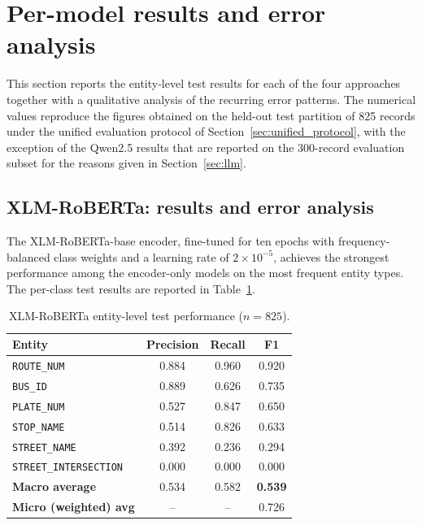 \section{Per-model results and error analysis}
\label{sec:per_model}

This section reports the entity-level test results for each of the four approaches together with a qualitative analysis of the recurring error patterns. The numerical values reproduce the figures obtained on the held-out test partition of 825 records under the unified evaluation protocol of Section~\ref{sec:unified_protocol}, with the exception of the Qwen2.5 results that are reported on the 300-record evaluation subset for the reasons given in Section~\ref{sec:llm}.

\subsection{XLM-RoBERTa: results and error analysis}
\label{sec:xlmr_results}

The XLM-RoBERTa-base encoder, fine-tuned for ten epochs with frequency-balanced class weights and a learning rate of $2{\times}10^{-5}$, achieves the strongest performance among the encoder-only models on the most frequent entity types. The per-class test results are reported in Table~\ref{tab:xlmr}.

\begin{table}[H]
\centering
\caption{XLM-RoBERTa entity-level test performance ($n=825$).}
\label{tab:xlmr}
\renewcommand{\arraystretch}{1.3}
\begin{tabular}{lccc}
\toprule
\textbf{Entity} & \textbf{Precision} & \textbf{Recall} & \textbf{F1} \\
\midrule
\texttt{ROUTE\_NUM}           & 0.884 & 0.960 & 0.920 \\
\texttt{BUS\_ID}              & 0.889 & 0.626 & 0.735 \\
\texttt{PLATE\_NUM}           & 0.527 & 0.847 & 0.650 \\
\texttt{STOP\_NAME}           & 0.514 & 0.826 & 0.633 \\
\texttt{STREET\_NAME}         & 0.392 & 0.236 & 0.294 \\
\texttt{STREET\_INTERSECTION} & 0.000 & 0.000 & 0.000 \\
\midrule
\textbf{Macro average}        & 0.534 & 0.582 & \textbf{0.539} \\
\textbf{Micro (weighted) avg} & --    & --    & 0.726 \\
\bottomrule
\end{tabular}
\end{table}

